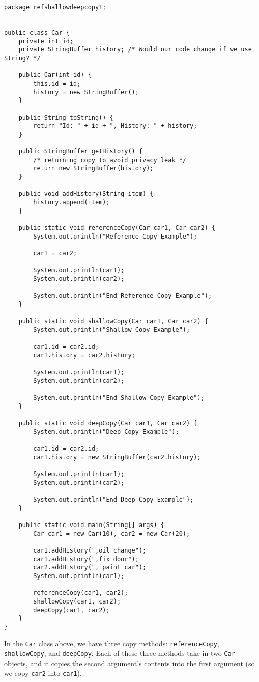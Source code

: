 \begin{lstlisting}
package refshallowdeepcopy1;


public class Car {
	private int id;
	private StringBuffer history; /* Would our code change if we use String? */
	
	public Car(int id) {
		this.id = id;
		history = new StringBuffer();
	}

	public String toString() {
		return "Id: " + id + ", History: " + history;
	}
	
	public StringBuffer getHistory() {
		/* returning copy to avoid privacy leak */
		return new StringBuffer(history); 
	}
	
	public void addHistory(String item) {
		history.append(item);
	}
	
	public static void referenceCopy(Car car1, Car car2) {
		System.out.println("Reference Copy Example");
		
		car1 = car2;
		
		System.out.println(car1);
		System.out.println(car2);
		
		System.out.println("End Reference Copy Example");	
	}

	public static void shallowCopy(Car car1, Car car2) {
		System.out.println("Shallow Copy Example");
		
		car1.id = car2.id;
		car1.history = car2.history;
		
		System.out.println(car1);
		System.out.println(car2);
		
		System.out.println("End Shallow Copy Example");
	}

	public static void deepCopy(Car car1, Car car2) {
		System.out.println("Deep Copy Example");
		
		car1.id = car2.id;
		car1.history = new StringBuffer(car2.history);
		
		System.out.println(car1);
		System.out.println(car2);
		
		System.out.println("End Deep Copy Example");
	}

	public static void main(String[] args) {
		Car car1 = new Car(10), car2 = new Car(20);
		
		car1.addHistory(",oil change");
		car1.addHistory(",fix door");		
		car2.addHistory(", paint car");
		System.out.println(car1);
		
		referenceCopy(car1, car2);
		shallowCopy(car1, car2);
		deepCopy(car1, car2);
	}
}
\end{lstlisting}

In the \verb!Car! class above, we have three copy methods: \verb!referenceCopy!, \verb!shallowCopy!, and \verb!deepCopy!. Each of these three methods take in two \verb!Car! objects, and it copies the second argument's contents into the first argument (so we copy \verb!car2! into \verb!car1!).  \\

